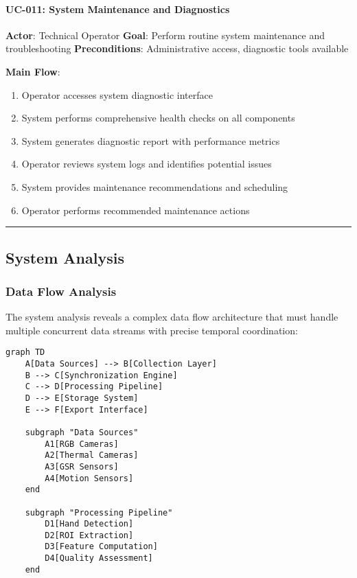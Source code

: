 \documentclass[11pt,a4paper]{report}
\begin{document}
\paragraph{UC-011: System Maintenance and Diagnostics}

\textbf{Actor}: Technical Operator
\textbf{Goal}: Perform routine system maintenance and troubleshooting
\textbf{Preconditions}: Administrative access, diagnostic tools available

\textbf{Main Flow}:

\begin{enumerate}
\item Operator accesses system diagnostic interface
\item System performs comprehensive health checks on all components
\item System generates diagnostic report with performance metrics
\item Operator reviews system logs and identifies potential issues
\item System provides maintenance recommendations and scheduling
\item Operator performs recommended maintenance actions

\end{enumerate}
\hrule

\subsection{System Analysis}

\subsubsection{Data Flow Analysis}

The system analysis reveals a complex data flow architecture that must handle multiple concurrent data streams with
precise temporal coordination:

\begin{verbatim}
graph TD
    A[Data Sources] --> B[Collection Layer]
    B --> C[Synchronization Engine]
    C --> D[Processing Pipeline]
    D --> E[Storage System]
    E --> F[Export Interface]

    subgraph "Data Sources"
        A1[RGB Cameras]
        A2[Thermal Cameras]
        A3[GSR Sensors]
        A4[Motion Sensors]
    end

    subgraph "Processing Pipeline"
        D1[Hand Detection]
        D2[ROI Extraction]
        D3[Feature Computation]
        D4[Quality Assessment]
    end
\end{verbatim}
\end{document}
